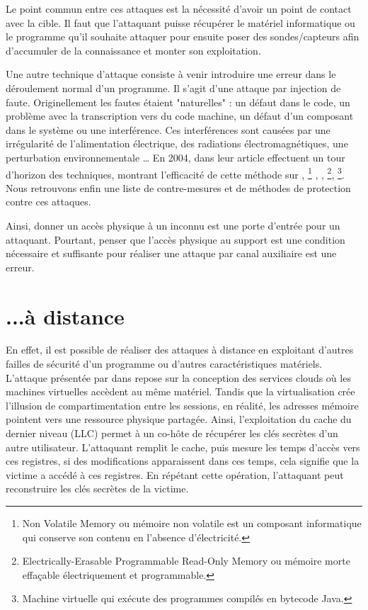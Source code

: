 Le point commun entre ces attaques est la nécessité d'avoir un point de contact avec la cible. Il faut que l'attaquant puisse récupérer le matériel informatique ou le programme qu'il souhaite attaquer pour ensuite poser des sondes/capteurs afin d'accumuler de la connaissance et monter son exploitation.\bigbreak


Une autre technique d'attaque consiste à venir introduire une erreur dans le déroulement normal d'un programme. Il s'agit d'une attaque par injection de faute. Originellement \cite{faultOverview} les fautes étaient "naturelles" : un défaut dans le code, un problème avec la transcription vers du code machine, un défaut d'un composant dans le système ou une interférence. Ces interférences sont causées par une irrégularité de l'alimentation électrique, des radiations électromagnétiques, une perturbation environnementale \etc\dots
En 2004, \citeauthor{Fault_Attacks} dans leur article  \cite{Fault_Attacks} effectuent un tour d'horizon des techniques, montrant l'efficacité de cette méthode sur 
, \footnote{Non Volatile Memory ou mémoire non volatile est un composant informatique qui conserve son contenu en l'absence d'électricité.}
, %
, \footnote{Electrically-Erasable Programmable Read-Only Memory ou mémoire morte effaçable électriquement et programmable.}, \footnote{Machine virtuelle qui exécute des programmes compilés en bytecode Java.}. Nous retrouvons enfin une liste de contre-mesures et de méthodes de protection contre ces attaques.\medbreak

Ainsi, donner un accès physique à un inconnu est une porte d'entrée pour un attaquant. Pourtant, penser que l'accès physique au support est une condition nécessaire et suffisante pour réaliser une attaque par canal auxiliaire est une erreur.

\section{...à distance}

En effet, il est possible de réaliser des attaques à distance en exploitant d'autres failles de sécurité d'un programme ou d'autres caractéristiques matériels. L'attaque présentée par \citeauthor{LLC_attack} dans  \cite{LLC_attack} repose sur la conception des services clouds où les machines virtuelles accèdent au même matériel. Tandis que la virtualisation crée l'illusion de compartimentation entre les sessions, en réalité, les adresses mémoire pointent vers une ressource physique partagée. Ainsi, l'exploitation du cache du dernier niveau (LLC) permet à un co-hôte de récupérer les clés secrètes d'un autre utilisateur. L'attaquant remplit le cache, puis mesure les temps d'accès vers ces registres, si des modifications apparaissent dans ces temps, cela signifie que la victime a accédé à ces registres. En répétant cette opération, l'attaquant peut reconstruire les clés secrètes de la victime.\medbreak


